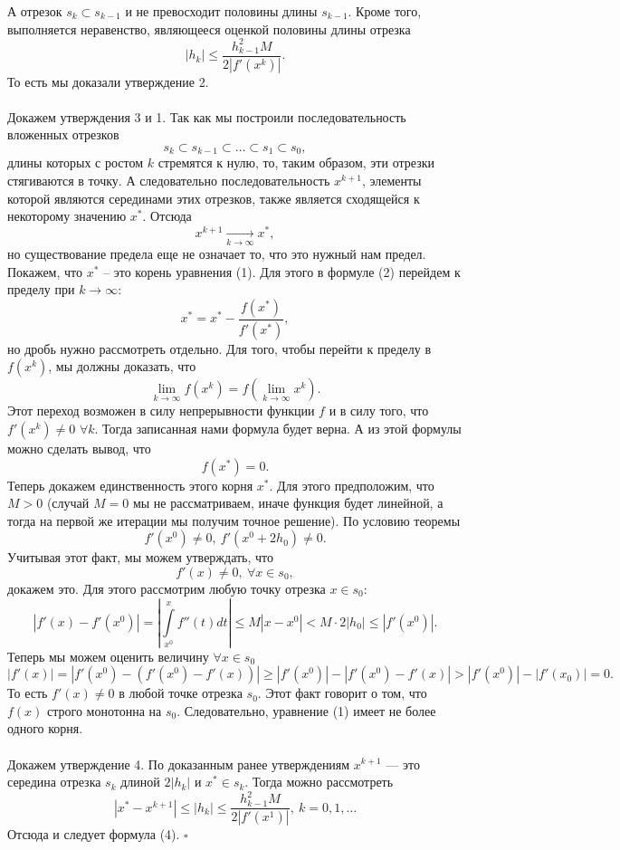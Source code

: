\documentclass[a4paper, 12pt]{report}
\numberwithin{equation}{section}
\newenvironment{Proof} %
{\par\noindent{$\blacklozenge$}} %
{\hfill$\scriptstyle\square$}
\renewcommand{\leq}{\leqslant}
\renewcommand{\geq}{\geqslant}
\begin{document}
\begin{Proof}
		А отрезок $s_k\subset s_{k-1}$ и не превосходит половины длины $s_{k-1}$. Кроме того, выполняется неравенство, являющееся оценкой половины длины отрезка $$|h_k| \leq \dfrac{h_{k-1}^2M}{2|f'(x^k)|}.$$
		То есть мы доказали утверждение 2.\\\\
		Докажем утверждения 3 и 1. Так как мы построили последовательность вложенных отрезков $$s_k \subset s_{k-1}\subset \ldots \subset s_1 \subset s_0,$$ длины которых с ростом $k$ стремятся к нулю, то, таким образом, эти отрезки стягиваются в точку. А следовательно последовательность $x^{k+1}$, элементы которой являются серединами этих отрезков, также является сходящейся к некоторому значению $x^*$. Отсюда $$x^{k+1}\xrightarrow[k\to\infty]{} x^*,$$
		но существование предела еще не означает то, что это нужный нам предел. Покажем, что $x^*$ -- это корень уравнения (1). Для этого в формуле (2) перейдем к пределу при $k\to\infty$: $$x^* = x^* - \dfrac{f(x^*)}{f'(x^*)},$$ но дробь нужно рассмотреть отдельно. Для того, чтобы перейти к пределу в $f(x^k)$, мы должны доказать, что $$\lim\limits_{k\to\infty}f(x^k) = f(\lim\limits_{k\to\infty}x^k).$$
		Этот переход возможен в силу непрерывности функции $f$ и в силу того, что $f'(x^k)\ne 0$ $\forall k$. Тогда записанная нами формула будет верна. А из этой формулы можно сделать вывод, что $$f(x^*) =0.$$
		Теперь докажем единственность этого корня $x^*$. Для этого предположим, что $M > 0$ (случай $M = 0$ мы не рассматриваем, иначе функция будет линейной, а тогда на первой же итерации мы получим точное решение). По условию теоремы $$f'(x^0) \ne 0,\ f'(x^0 + 2h_0) \ne 0.$$
		Учитывая этот факт, мы можем утверждать, что $$f'(x) \ne 0,\ \forall x \in s_0,$$
		докажем это. Для этого рассмотрим любую точку отрезка $x \in s_0$: $$|f'(x) - f'(x^0)|  = \left|\int\limits_{x^0}^x f''(t)dt\right|\leq M|x-x^0| < M \cdot 2|h_0|\leq |f'(x^0)|.$$
		Теперь мы можем оценить величину $\forall x \in s_0$ $$|f'(x)| = |f'(x^0) - (f'(x^0) - f'(x))| \geq |f'(x^0)| - |f'(x^0) - f'(x)|>  |f'(x^0)| - |f'(x_0)| = 0.$$
		То есть $f'(x)\ne 0$ в любой точке отрезка $s_0$. Этот факт говорит о том, что $f(x)$ строго монотонна на $s_0$. Следовательно, уравнение (1) имеет не более одного корня.\\\\
		Докажем утверждение 4. По доказанным ранее утверждениям $x^{k+1}$ --- это середина отрезка $s_k$ длиной $2|h_k|$ и $x^* \in s_k$. Тогда можно рассмотреть $$|x^* - x^{k+1}| \leq |h_k|\leq \dfrac{h_{k-1}^2 M}{2 |f'(x^1)|},\ k=0,1,\ldots$$
		Отсюда и следует формула (4).
	\end{Proof}\\\\
\end{document}
